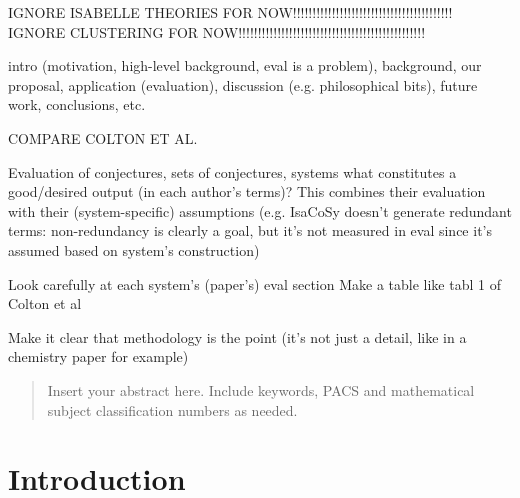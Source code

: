 
\date{Received: date / Accepted: date}


\maketitle
IGNORE ISABELLE THEORIES FOR NOW!!!!!!!!!!!!!!!!!!!!!!!!!!!!!!!!!!!!!!!!!
IGNORE CLUSTERING FOR NOW!!!!!!!!!!!!!!!!!!!!!!!!!!!!!!!!!!!!!!!!!!!!!!!!

intro (motivation, high-level background, eval is a problem),
background,
our proposal,
application (evaluation),
discussion (e.g. philosophical bits),
future work, conclusions, etc.

COMPARE COLTON ET AL.

Evaluation of conjectures, sets of conjectures, systems
what constitutes a good/desired output (in each author's terms)? This combines
their evaluation with their (system-specific) assumptions (e.g. IsaCoSy doesn't
generate redundant terms: non-redundancy is clearly a goal, but it's not measured
in eval since it's assumed based on system's construction)

Look carefully at each system's (paper's) eval section
Make a table like tabl 1 of Colton et al

Make it clear that methodology is the point (it's not just a detail, like in a
chemistry paper for example)

\begin{abstract}
Insert your abstract here. Include keywords, PACS and mathematical
subject classification numbers as needed.
\end{abstract}

\section{Introduction}
\label{intro}

